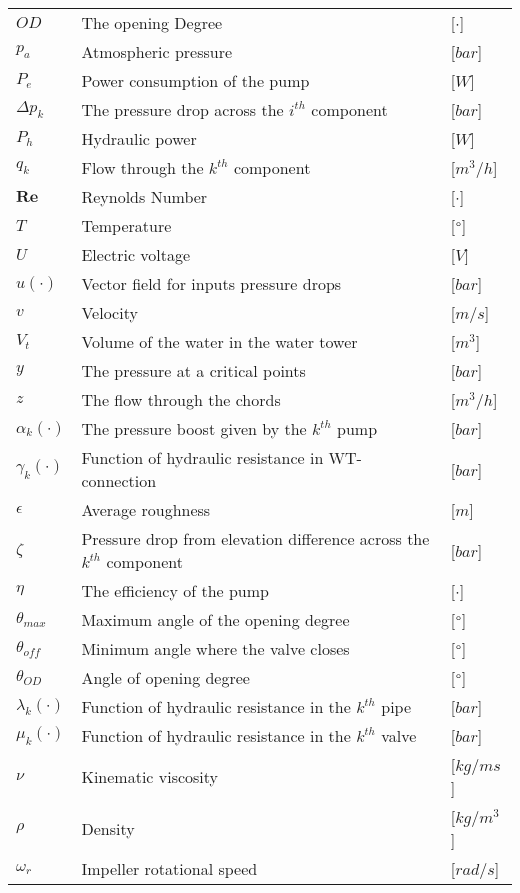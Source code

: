 \begin{tabular}{l l l}
	$OD$				&	The opening Degree 											& [$\cdot$]\\	
	$p_a$				&	Atmospheric pressure							      		& [$bar$]\\
	$P_e$				&	Power consumption of the pump					      		& [$W$]\\
	$\Delta p_k$		&	The pressure drop across the $i^{th}$ component      		& [$bar$]\\
	$P_h$				&	Hydraulic power									      		& [$W$]\\
	$q_k$				&	Flow through the $k^{th}$ component 		     			& [$m^3/h$]\\
	$\bm{Re}$			&	Reynolds Number								     			& [$\cdot$]\\
	$T$					&	Temperature									     			& [$\degree$]\\
	$U$					&	Electric voltage 											& [$V$]\\
	$u(\cdot)$			&	Vector field for inputs pressure drops 						& [$bar$]\\
	$v$					&	Velocity									     			& [$m/s$]\\
	$V_t$				&	Volume of the water in the water tower						& [$m^3$]\\
	$y$					&	The pressure at a critical points							& [$bar$]\\	
	$z$					&	The flow through the chords									& [$m^3/h$]\\
	$\alpha_k(\cdot)$	&	The pressure boost given by the	$k^{th}$ pump				& [$bar$]\\
	$\gamma_k(\cdot)$	&	Function of hydraulic resistance in WT-connection			& [$bar$]\\
	$\epsilon$			&	Average roughness									     	& [$m$]\\
	$\zeta$				&	Pressure drop from elevation difference across the $k^{th}$ component	& [$bar$]\\
	$\eta$				&	The efficiency of the pump								   	& [$\cdot$]\\
	$\theta_{max}$		&	Maximum angle of the opening degree						    & [$\degree$]\\
	$\theta_{off}$		&	Minimum angle where the valve closes						& [$\degree$]\\
	$\theta_{OD}$		&	Angle of opening degree										& [$\degree$]\\
	$\lambda_k(\cdot)$	&	Function of hydraulic resistance in the $k^{th}$ pipe		& [$bar$]\\
	$\mu_k(\cdot)$		&	Function of hydraulic resistance in the $k^{th}$ valve		& [$bar$]\\
	$\nu$				&	Kinematic viscosity									     	& [$kg/ms$]\\
	$\rho$				&	Density									     				& [$kg/m^3$]\\
	$\omega_r$			&	Impeller rotational speed									& [$rad/s$]\\	
\end{tabular}

